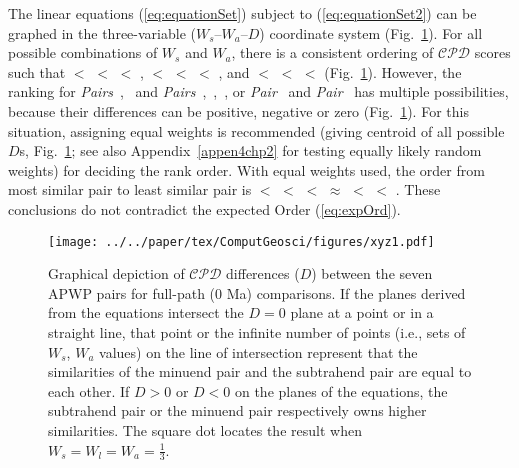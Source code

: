 The linear equations (\ref{eq:equationSet}) subject to (\ref{eq:equationSet2})
can be graphed in the three-variable ($W_s\textrm{--}W_a\textrm{--}D$)
coordinate system (Fig.~\ref{fig:pair-cmp}). For all possible combinations of
$W_s$ and $W_a$, there is a consistent ordering of $\mathcal{CPD}$ scores such
that \textbf{} $<$ \textbf{} $<$
\textbf{} $<$ \textbf{},
\textbf{} $<$ \textbf{} $<$
\textbf{} $<$ \textbf{}, and
\textbf{} $<$ \textbf{} $<$
\textbf{} $<$ \textbf{}
(Fig.~\ref{fig:pair-cmp}). However, the ranking for
\emph{Pairs}~\textbf{},~\textbf{} and
\emph{Pairs}~\textbf{},~\textbf{},~\textbf{},
or \emph{Pair}~\textbf{} and
\emph{Pair}~\textbf{} has multiple possibilities, because
their differences can be positive, negative or zero (Fig.~\ref{fig:pair-cmp}).
For this situation, assigning equal weights is recommended (giving centroid of
all possible $D$s, Fig.~\ref{fig:pair-cmp}; see also Appendix~\ref{appen4chp2}
for testing equally likely random weights) for deciding the rank order. With
equal weights used, the order from most similar pair to least similar pair is
\textbf{} $<$ \textbf{} $<$
\textbf{} $<$ \textbf{} $\approx$
\textbf{} $<$ \textbf{} $<$
\textbf{}.
These conclusions do not contradict the expected Order (\ref{eq:expOrd}).

\begin{figure}[tbp]
\texttt{[image: ../../paper/tex/ComputGeosci/figures/xyz1.pdf]}
\caption[Criteria of pair comparisons]{Graphical depiction of $\mathcal{CPD}$
differences ($D$) between the seven APWP pairs for full-path (0
Ma) comparisons. If the planes derived from the equations intersect the $D=0$
plane at a point or in a straight line, that point or the infinite number of
points (i.e., sets of $W_s$, $W_a$ values) on the line of intersection represent
that the similarities of the minuend pair and the subtrahend pair are equal to
each other. If $D>0$ or $D<0$ on the planes of the equations, the subtrahend
pair or the minuend pair respectively owns higher similarities. The square dot
locates the result when $W_s=W_l=W_a=\frac{1}{3}$.}\label{fig:pair-cmp}
\end{figure}

